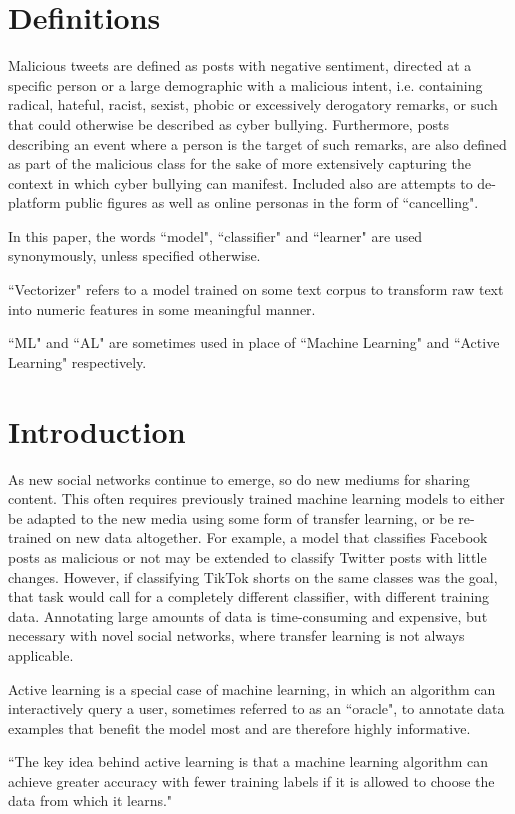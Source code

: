 \documentclass[a4paper,12pt]{article}
\begin{document}
\section*{Definitions}
%
Malicious tweets are defined as posts with negative sentiment, directed at a specific person or a large demographic with a malicious intent, i.e. containing radical, hateful, racist, sexist, phobic or excessively derogatory remarks, or such that could otherwise be described as cyber bullying. Furthermore, posts describing an event where a person is the target of such remarks, are also defined as part of the malicious class for the sake of more extensively capturing the context in which cyber bullying can manifest. Included also are attempts to de-platform public figures as well as online personas in the form of ``cancelling".

In this paper, the words ``model", ``classifier" and ``learner" are used synonymously, unless specified otherwise.

``Vectorizer" refers to a model trained on some text corpus to transform raw text into numeric features in some meaningful manner.

``ML" and ``AL" are sometimes used in place of ``Machine Learning" and ``Active Learning" respectively.
\newpage
\section{Introduction}
As new social networks continue to emerge, so do new mediums for sharing content. This often requires previously trained machine learning models to either be adapted to the new media using some form of transfer learning, or be re-trained on new data altogether. For example, a model that classifies Facebook posts as malicious or not may be extended to classify Twitter posts with little changes. However, if classifying TikTok shorts on the same classes was the goal, that task would call for a completely different classifier, with different training data. Annotating large amounts of data is time-consuming and expensive, but necessary with novel social networks, where transfer learning is not always applicable.

Active learning is a special case of machine learning, in which an algorithm can interactively query a user, sometimes referred to as an ``oracle", to annotate data examples that benefit the model most and are therefore highly informative.

``The key idea behind active learning is that a machine learning algorithm can
achieve greater accuracy with fewer training labels if it is allowed to choose the data from which it learns."\cite{Settles2009}
\end{document}
